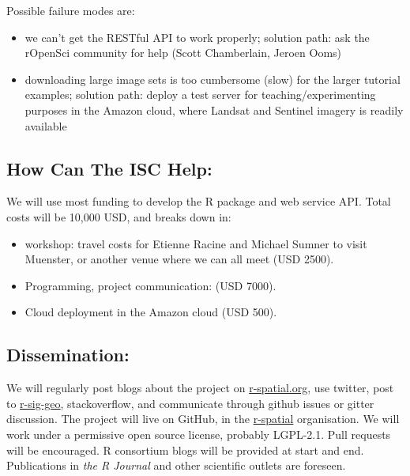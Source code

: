 \noindent
Possible failure modes are:

\begin{itemize}
\tightlist
\item
  we can't get the RESTful API to work properly; solution path: ask the
  rOpenSci community for help (Scott Chamberlain, Jeroen Ooms)
\item
  downloading large image sets is too cumbersome (slow) for the larger
  tutorial examples; solution path: deploy a test server for
  teaching/experimenting purposes in the Amazon cloud, where Landsat and
  Sentinel imagery is readily available
\end{itemize}

\subsection*{How Can The ISC Help:}\label{how-can-the-isc-help}

We will use most funding to develop the R package and web service API.
Total costs will be 10,000 USD, and breaks down in:

\begin{itemize}
\tightlist
\item
  workshop: travel costs for Etienne Racine and Michael Sumner to visit
  Muenster, or another venue where we can all meet (USD 2500).
\item
  Programming, project communication: (USD 7000).
\item
  Cloud deployment in the Amazon cloud (USD 500).
\end{itemize}

\subsection*{Dissemination:}\label{dissemination}

We will regularly post blogs about the project on
\href{https://r-spatial.org/}{r-spatial.org}, use twitter, post to
\href{https://stat.ethz.ch/mailman/listinfo/r-sig-geo}{r-sig-geo},
stackoverflow, and communicate through github issues or gitter
discussion. The project will live on GitHub, in the
\href{https://github.com/r-spatial/}{r-spatial} organisation. We will
work under a permissive open source license, probably LGPL-2.1. Pull
requests will be encouraged. R consortium blogs will be provided at
start and end. Publications in \emph{the R Journal} and other scientific
outlets are foreseen.
